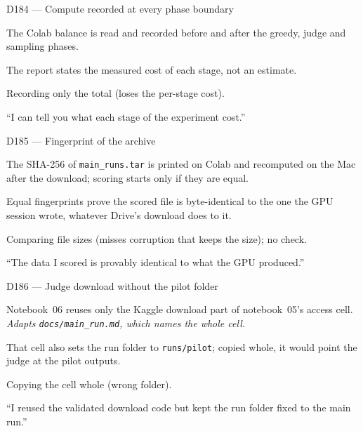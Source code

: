 \documentclass[11pt,a4paper]{report}
\begin{document}
\begin{decisionbox}{D184 --- Compute recorded at every phase boundary}
\begin{description}[nosep, leftmargin=0pt]
  \item[Decision.] The Colab balance is read and recorded before and after the greedy, judge and sampling phases.
  \item[Why.] The report states the measured cost of each stage, not an estimate.
  \item[Alternatives.] Recording only the total (loses the per-stage cost).
  \item[Interview line.] ``I can tell you what each stage of the experiment cost.''
\end{description}
\end{decisionbox}

\begin{decisionbox}{D185 --- Fingerprint of the archive}
\begin{description}[nosep, leftmargin=0pt]
  \item[Decision.] The SHA-256 of \texttt{main\_runs.tar} is printed on Colab and recomputed on the Mac after the download; scoring starts only if they are equal.
  \item[Why.] Equal fingerprints prove the scored file is byte-identical to the one the GPU session wrote, whatever Drive's download does to it.
  \item[Alternatives.] Comparing file sizes (misses corruption that keeps the size); no check.
  \item[Interview line.] ``The data I scored is provably identical to what the GPU produced.''
\end{description}
\end{decisionbox}

\begin{decisionbox}{D186 --- Judge download without the pilot folder}
\begin{description}[nosep, leftmargin=0pt]
  \item[Decision.] Notebook~06 reuses only the Kaggle download part of notebook~05's access cell. \emph{Adapts \texttt{docs/main\_run.md}, which names the whole cell.}
  \item[Why.] That cell also sets the run folder to \texttt{runs/pilot}; copied whole, it would point the judge at the pilot outputs.
  \item[Alternatives.] Copying the cell whole (wrong folder).
  \item[Interview line.] ``I reused the validated download code but kept the run folder fixed to the main run.''
\end{description}
\end{decisionbox}
\end{document}
